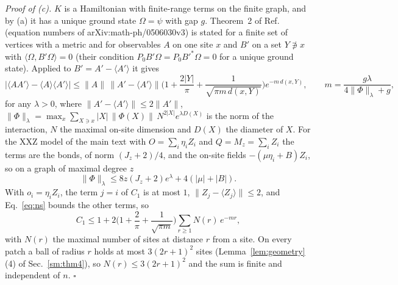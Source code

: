 \documentclass[aps,prx,onecolumn,10pt,nofootinbib,longbibliography,floatfix]{revtex4-2}
\theoremstyle{remark}
\newcommand{\Jz}{J_z}
\begin{document}
\emph{Proof of (c).} $K$ is a Hamiltonian with finite-range terms on the finite graph, and by (a) it has a unique
ground state $\Omega=\psi$ with gap $g$. Theorem~2 of Ref.~\cite{nachtergaele2006} (equation numbers of %
arXiv:math-ph/0506030v3) is stated for a finite set of %
vertices with a metric and for observables $A$ on one site $x$ and $B'$ on a set $Y\not\ni x$ with
$\langle\Omega,B'\Omega\rangle=0$ (their condition $P_0B'\Omega=P_0B'^*\Omega=0$ for a unique ground state). Applied to
$B'=A'-\langle A'\rangle$ it gives
\begin{equation}
|\langle AA'\rangle-\langle A\rangle\langle A'\rangle|\le\|A\|\,\|A'-\langle A'\rangle\|
\Big(1+\frac{2|Y|}{\pi}+\frac{1}{\sqrt{\pi m\,d(x,Y)}}\Big)e^{-m\,d(x,Y)},\qquad %
m=\frac{g\lambda}{4\|\Phi\|_\lambda+g}, %
\label{eq:ns}
\end{equation}
for any $\lambda>0$, where $\|A'-\langle A'\rangle\|\le2\|A'\|$,
$\|\Phi\|_\lambda=\max_x\sum_{X\ni x}|X|\,\|\Phi(X)\|\,N^{2|X|}e^{\lambda D(X)}$ is the norm of the interaction, $N$ the
maximal on-site dimension and $D(X)$ the diameter of $X$. For the XXZ model of the main text with
$O=\sum_i\eta_iZ_i$ and $Q=M_z=\sum_iZ_i$ the terms are the bonds, of norm $(\Jz+2)/4$, and the on-site fields
$-(\mu\eta_i+B)Z_i$, so on a graph of maximal degree $z$
\begin{equation}
\|\Phi\|_\lambda\le8z(\Jz+2)e^{\lambda}+4(|\mu|+|B|). %
\end{equation}
With $o_i=\eta_iZ_i$, the term $j=i$ of $C_1$ is at most $1$, $\|Z_j-\langle Z_j\rangle\|\le2$, and %
Eq.~\eqref{eq:ns} bounds the other terms, so
\begin{equation}
C_1\le1+2\Big(1+\frac2\pi+\frac1{\sqrt{\pi m}}\Big)\sum_{r\ge1}N(r)\,e^{-mr}, %
\label{eq:c1bound}
\end{equation}
with $N(r)$ the maximal number of sites at distance $r$ from a site. On every patch a ball of radius $r$ holds at
most $3(2r+1)^2$ sites (Lemma~\ref{lem:geometry}(4) of Sec.~\ref{sm:thm4}), so $N(r)\le3(2r+1)^2$ and the %
sum is finite and independent of $n$.
\hfill$\square$
\end{document}

